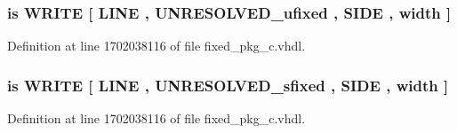 \subsubsection[{B\+I\+N\+A\+R\+Y\+\_\+\+W\+R\+I\+T\+E}]{ {\bfseries \textcolor{keywordflow}{is}\textcolor{vhdlchar}{ }\textcolor{vhdlchar}{W\+R\+I\+T\+E}\textcolor{vhdlchar}{ }\textcolor{vhdlchar}{\mbox{[}}\textcolor{vhdlchar}{ }\textcolor{vhdlchar}{L\+I\+N\+E}\textcolor{vhdlchar}{ }\textcolor{vhdlchar}{,}\textcolor{vhdlchar}{ }{\bfseries {\bf U\+N\+R\+E\+S\+O\+L\+V\+E\+D\+\_\+ufixed}} \textcolor{vhdlchar}{ }\textcolor{vhdlchar}{,}\textcolor{vhdlchar}{ }\textcolor{vhdlchar}{S\+I\+D\+E}\textcolor{vhdlchar}{ }\textcolor{vhdlchar}{,}\textcolor{vhdlchar}{ }\textcolor{vhdlchar}{width}\textcolor{vhdlchar}{ }\textcolor{vhdlchar}{\mbox{]}}\textcolor{vhdlchar}{ }} \hspace{0.3cm}{\ttfamily [Alias]}}\label{classfixed__pkg_a2f31bd3069337e306a8011a2773dce9b}


Definition at line 1702038116 of file fixed\+\_\+pkg\+\_\+c.\+vhdl.

\hypertarget{classfixed__pkg_a3a60d07ba5cd05a0b7f09ee30e4b6895}{}
\subsubsection[{B\+I\+N\+A\+R\+Y\+\_\+\+W\+R\+I\+T\+E}]{ {\bfseries \textcolor{keywordflow}{is}\textcolor{vhdlchar}{ }\textcolor{vhdlchar}{W\+R\+I\+T\+E}\textcolor{vhdlchar}{ }\textcolor{vhdlchar}{\mbox{[}}\textcolor{vhdlchar}{ }\textcolor{vhdlchar}{L\+I\+N\+E}\textcolor{vhdlchar}{ }\textcolor{vhdlchar}{,}\textcolor{vhdlchar}{ }{\bfseries {\bf U\+N\+R\+E\+S\+O\+L\+V\+E\+D\+\_\+sfixed}} \textcolor{vhdlchar}{ }\textcolor{vhdlchar}{,}\textcolor{vhdlchar}{ }\textcolor{vhdlchar}{S\+I\+D\+E}\textcolor{vhdlchar}{ }\textcolor{vhdlchar}{,}\textcolor{vhdlchar}{ }\textcolor{vhdlchar}{width}\textcolor{vhdlchar}{ }\textcolor{vhdlchar}{\mbox{]}}\textcolor{vhdlchar}{ }} \hspace{0.3cm}{\ttfamily [Alias]}}\label{classfixed__pkg_a3a60d07ba5cd05a0b7f09ee30e4b6895}


Definition at line 1702038116 of file fixed\+\_\+pkg\+\_\+c.\+vhdl.

